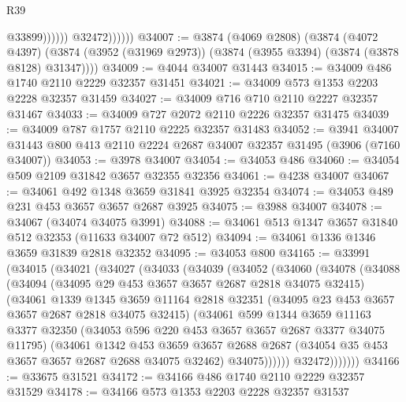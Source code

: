\begin{lexlean}{R39}
\begin{coremodule}
                            @33899))))))
                @32472))))))
@34007 := @3874
    (@4069 @2808)
    (@3874
      (@4072 @4397)
      (@3874 (@3952 (@31969 @2973)) (@3874 (@3955 @3394) (@3874 (@3878 @8128) @31347))))
@34009 := @4044 @34007 @31443
@34015 := @34009 @486 @1740 @2110 @2229 @32357 @31451
@34021 := @34009 @573 @1353 @2203 @2228 @32357 @31459
@34027 := @34009 @716 @710 @2110 @2227 @32357 @31467
@34033 := @34009 @727 @2072 @2110 @2226 @32357 @31475
@34039 := @34009 @787 @1757 @2110 @2225 @32357 @31483
@34052 := @3941
    @34007
    @31443
    @800
    @413
    @2110
    @2224
    @2687
    @34007
    @32357
    @31495
    (@3906 (@7160 @34007))
@34053 := @3978 @34007
@34054 := @34053 @486
@34060 := @34054 @509 @2109 @31842 @3657 @32355 @32356
@34061 := @4238 @34007
@34067 := @34061 @492 @1348 @3659 @31841 @3925 @32354
@34074 := @34053 @489 @231 @453 @3657 @3657 @2687 @3925
@34075 := @3988 @34007
@34078 := @34067 (@34074 @34075 @3991)
@34088 := @34061 @513 @1347 @3657 @31840 @512 @32353 (@11633 @34007 @72 @512)
@34094 := @34061 @1336 @1346 @3659 @31839 @2818 @32352
@34095 := @34053 @800
@34165 := @33991
    (@34015
      (@34021
        (@34027
          (@34033
            (@34039
              (@34052
                (@34060
                  (@34078
                    (@34088
                      (@34094
                        (@34095 @29 @453 @3657 @3657 @2687 @2818 @34075 @32415)
                        (@34061
                          @1339
                          @1345
                          @3659
                          @11164
                          @2818
                          @32351
                          (@34095 @23 @453 @3657 @3657 @2687 @2818 @34075 @32415)
                          (@34061
                            @599
                            @1344
                            @3659
                            @11163
                            @3377
                            @32350
                            (@34053 @596 @220 @453 @3657 @3657 @2687 @3377 @34075 @11795)
                            (@34061
                              @1342
                              @453
                              @3659
                              @3657
                              @2688
                              @2687
                              (@34054 @35 @453 @3657 @3657 @2687 @2688 @34075 @32462)
                              @34075))))))
                  @32472)))))))
@34166 := @33675 @31521
@34172 := @34166 @486 @1740 @2110 @2229 @32357 @31529
@34178 := @34166 @573 @1353 @2203 @2228 @32357 @31537

\end{coremodule}
\end{lexlean}

